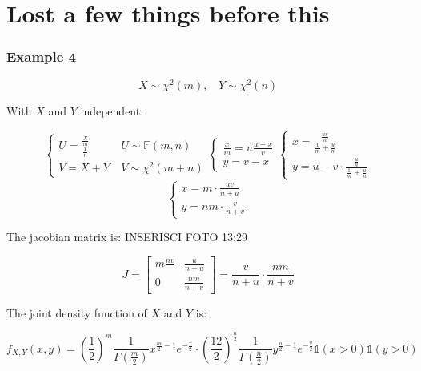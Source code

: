 \section{Lost a few things before this}

\subsubsection{Example 4}

    \[X \sim \chi^2 (m), \ \ \ \ Y \sim \chi^2(n)\]

    With \(X\) and \(Y\) independent.

    \[
    \begin{cases}
        U = \frac{\frac{X}{m}}{\frac{Y}{n}} & \ U \sim \mathbb{F} (m,n) \\
        V = X+Y  & \ V \sim \chi^2 (m+n) 
    \end{cases} \begin{cases}
        \frac{x}{m} = u \frac{u-x}{v} \\
        y = v-x
    \end{cases} \begin{cases}
        x = \frac{\frac{uv}{n}}{\frac{1}{m}+\frac{u}{n}} \\
        y = u-v \cdot \frac{\frac{u}{n}}{\frac{1}{m}+ \frac{u}{n}}
    \end{cases}
    \]
    \[
    \begin{cases}
        x = m \cdot \frac{uv}{n+u} \\
        y = nm \cdot \frac{v}{n+v}
    \end{cases}
    \]

    The jacobian matrix is: INSERISCI FOTO 13:29

    \[
    J = \begin{bmatrix}
        m \frac{nv}{} & \frac{u}{n+u} \\
        0 & \frac{nm}{n+v}
    \end{bmatrix} = \frac{v}{n+u} \cdot \frac{nm}{n+v}
    \]

    The joint density function of \(X\) and \(Y\) is:

    \[
    f_{X,Y} (x,y) = {\left(\frac{1}{2}\right)}^m \frac{1}{\Gamma \left(\frac{m}{2}\right)} x^{\frac{m}{2}-1} e^{-\frac{x}{2}} \cdot {\left(\frac{12}{2}\right)}^{\frac{n}{2}} \frac{1}{\Gamma \left(\frac{n}{2}\right)} y^{\frac{n}{2}-1} e^{-\frac{y}{2}} \mathbb{1}(x>0) \mathbb{1}(y>0)
    \]














